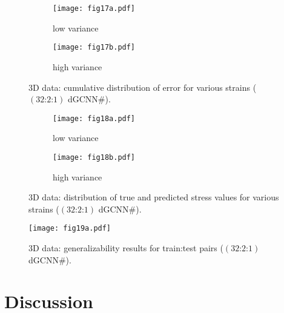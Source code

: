 \documentclass[12pt,reqno]{article}
\newcommand{\DGCNN}{{dGCNN}}
\newcommand{\arch}[3]{({#1}\text{:}{#2}\text{:}{#3})}
\begin{document}
\begin{figure}
\centering
\begin{subfigure}[c]{0.55\textwidth}
{\texttt{[image: fig17a.pdf]}}
\caption{low variance}
\end{subfigure}
\begin{subfigure}[c]{0.55\textwidth}
{\texttt{[image: fig17b.pdf]}}
\caption{high variance}
\end{subfigure}
\caption{3D data: cumulative distribution of error for various strains ($\arch{32}{2}{1}$ \DGCNN\#).
}
\label{fig:error_CDFs}
\end{figure}

\begin{figure}
\centering
\begin{subfigure}[c]{0.55\textwidth}
{\texttt{[image: fig18a.pdf]}}
\caption{low variance}
\end{subfigure}
\begin{subfigure}[c]{0.55\textwidth}
{\texttt{[image: fig18b.pdf]}}
\caption{high variance}
\end{subfigure}
\caption{3D data: distribution of true and predicted stress values for various strains ($\arch{32}{2}{1}$ \DGCNN\#).
}
\label{fig:pred_PDFs}
\end{figure}

\begin{figure}
\centering
{\texttt{[image: fig19a.pdf]}}
\caption{3D data: generalizability results for train:test pairs ($\arch{32}{2}{1}$ \DGCNN\#).
}
\label{fig:generalizability}
\end{figure}

\section{Discussion}\label{sec:discussion}
\end{document}
